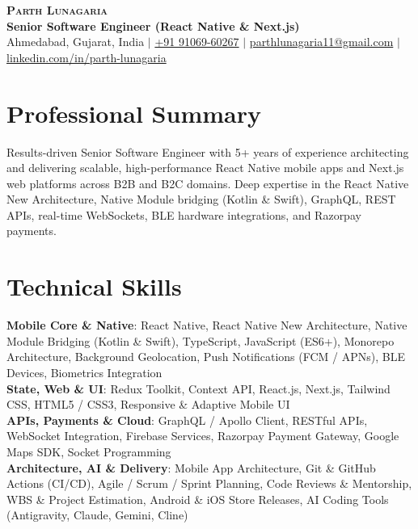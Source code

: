 \documentclass[letterpaper,10.5pt]{article}
\begin{document}
\begin{center}
  {\Huge \scshape \textbf{\color{accentColor}Parth Lunagaria}} \\ \vspace{3pt}
  {\small \textbf{Senior Software Engineer (React Native \& Next.js)}} \\ \vspace{3pt}
  \small
  Ahmedabad, Gujarat, India $|$
  \href{tel:+919106960267}{+91 91069-60267} $|$
  \href{mailto:parthlunagaria11@gmail.com}{parthlunagaria11@gmail.com} $|$
  \href{https://www.linkedin.com/in/parth-lunagaria}{linkedin.com/in/parth-lunagaria}
\end{center}
\vspace{-10pt}

\section{Professional Summary}
\small{Results-driven Senior Software Engineer with 5+ years of experience architecting and delivering scalable, high-performance React Native mobile apps and Next.js web platforms across B2B and B2C domains. Deep expertise in the React Native New Architecture, Native Module bridging (Kotlin \& Swift), GraphQL, REST APIs, real-time WebSockets, BLE hardware integrations, and Razorpay payments.}
\vspace{-4pt}

\section{Technical Skills}
\begin{itemize}[leftmargin=0.0in, label={}]
  \small{\item{
  \textbf{Mobile Core \& Native}: React Native, React Native New Architecture, Native Module Bridging (Kotlin \& Swift), TypeScript, JavaScript (ES6+), Monorepo Architecture, Background Geolocation, Push Notifications (FCM / APNs), BLE Devices, Biometrics Integration \\
  \textbf{State, Web \& UI}: Redux Toolkit, Context API, React.js, Next.js, Tailwind CSS, HTML5 / CSS3, Responsive \& Adaptive Mobile UI \\
  \textbf{APIs, Payments \& Cloud}: GraphQL / Apollo Client, RESTful APIs, WebSocket Integration, Firebase Services, Razorpay Payment Gateway, Google Maps SDK, Socket Programming \\
  \textbf{Architecture, AI \& Delivery}: Mobile App Architecture, Git \& GitHub Actions (CI/CD), Agile / Scrum / Sprint Planning, Code Reviews \& Mentorship, WBS \& Project Estimation, Android \& iOS Store Releases, AI Coding Tools (Antigravity, Claude, Gemini, Cline)
  }}
\end{itemize}
\vspace{-10pt}
\end{document}
